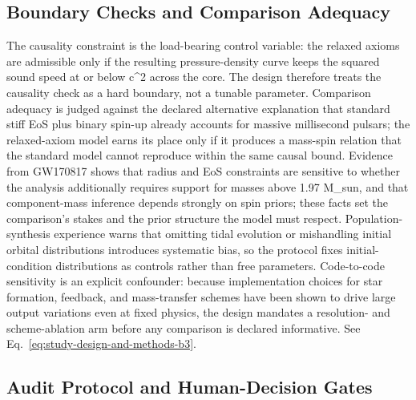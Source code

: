 \documentclass[conference]{IEEEtran}
\begin{document}
\subsection{Boundary Checks and Comparison Adequacy}
The causality constraint is the load-bearing control variable: the relaxed axioms are admissible only if the resulting pressure-density curve keeps the squared sound speed at or below c\textasciicircum{}2 across the core. The design therefore treats the causality check as a hard boundary, not a tunable parameter. Comparison adequacy is judged against the declared alternative explanation that standard stiff EoS plus binary spin-up already accounts for massive millisecond pulsars; the relaxed-axiom model earns its place only if it produces a mass-spin relation that the standard model cannot reproduce within the same causal bound. Evidence from GW170817 shows that radius and EoS constraints are sensitive to whether the analysis additionally requires support for masses above 1.97 M\_sun, and that component-mass inference depends strongly on spin priors; these facts set the comparison's stakes and the prior structure the model must respect. Population-synthesis experience warns that omitting tidal evolution or mishandling initial orbital distributions introduces systematic bias, so the protocol fixes initial-condition distributions as controls rather than free parameters. Code-to-code sensitivity is an explicit confounder: because implementation choices for star formation, feedback, and mass-transfer schemes have been shown to drive large output variations even at fixed physics, the design mandates a resolution- and scheme-ablation arm before any comparison is declared informative. See Eq.~\eqref{eq:study-design-and-methods-b3}.~\cite{cite_3d2e6757608d5364,cite_42e341ff6471ce89,cite_81b31d0d8218f9b8}

\subsection{Audit Protocol and Human-Decision Gates}
\end{document}
